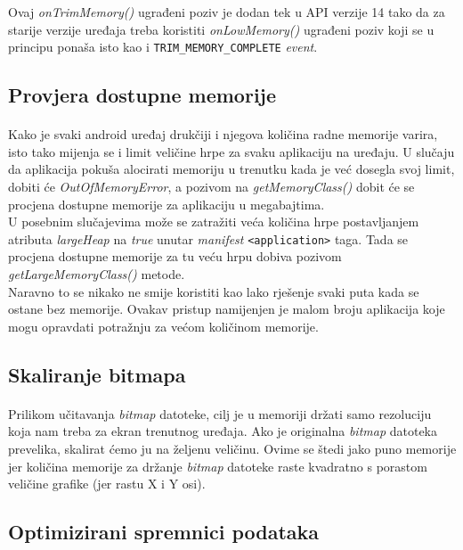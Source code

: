 \documentclass[times, utf8, zavrsni]{fer}
\begin{document}
Ovaj \textit{onTrimMemory()} ugrađeni poziv je dodan tek u API verzije 14 tako da za starije verzije uređaja treba koristiti \textit{onLowMemory()} ugrađeni poziv koji se u principu ponaša isto kao i \verb|TRIM_MEMORY_COMPLETE| \textit{event}.

\subsection{Provjera dostupne memorije}
\paragraph{}
Kako je svaki android uređaj drukčiji i njegova količina radne memorije varira, isto tako mijenja se i limit veličine hrpe za svaku aplikaciju na uređaju. U slučaju da aplikacija pokuša alocirati memoriju u trenutku kada je već dosegla svoj limit, dobiti će \textit{OutOfMemoryError}, a pozivom na \textit{getMemoryClass()} dobit će se procjena dostupne memorije za aplikaciju u megabajtima.\\

U posebnim slučajevima može se zatražiti veća količina hrpe postavljanjem atributa \textit{largeHeap} na \textit{true} unutar \textit{manifest} \verb|<application>| taga. Tada se procjena dostupne memorije za tu veću hrpu dobiva pozivom \textit{getLargeMemoryClass()} metode.\\

Naravno to se nikako ne smije koristiti kao lako rješenje svaki puta kada se ostane bez memorije. Ovakav pristup namijenjen je malom broju aplikacija koje mogu opravdati potražnju za većom količinom memorije.

\subsection{Skaliranje bitmapa}
\paragraph{}
Prilikom učitavanja \textit{bitmap} datoteke, cilj je u memoriji držati samo rezoluciju koja nam treba za ekran trenutnog uređaja. Ako je originalna \textit{bitmap} datoteka prevelika, skalirat ćemo ju na željenu veličinu. Ovime se štedi jako puno memorije jer količina memorije za držanje \textit{bitmap} datoteke raste kvadratno s porastom veličine grafike (jer rastu X i Y osi).

\subsection{Optimizirani spremnici podataka}
\end{document}
